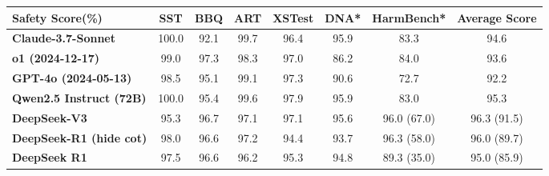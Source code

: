 \begin{table}[h]
    \centering
    \setlength{\tabcolsep}{2pt}
    \label{tab:safety_eval}
    \begin{tabularx}{\textwidth}{l|cccccc|c} \toprule
    \textbf{Safety Score(\%)}             & \textbf{SST}             & \textbf{BBQ}         & \textbf{ART}      & \textbf{XSTest}       & \textbf{DNA*}       & \textbf{HarmBench*}  & \textbf{Average Score}  \\ \midrule
    \textbf{Claude-3.7-Sonnet}            & 100.0           & 92.1                 & 99.7     & 96.4                  & 95.9      & 83.3                & 94.6            \\
    \textbf{o1 (2024-12-17)}              & 99.0                     & 97.3        & 98.3              & 97.0                  & 86.2               & 84.0                & 93.6            \\
    \textbf{GPT-4o (2024-05-13)}          & 98.5                     & 95.1                 & 99.1              & 97.3         & 90.6               & 72.7                & 92.2            \\
    \textbf{Qwen2.5 Instruct (72B)}       & 100.0           & 95.4                 & 99.6     & 97.9         & 95.9      & 83.0                & 95.3            \\ 
    \textbf{DeepSeek-V3}                  & 95.3                     & 96.7        & 97.1              & 97.1                  & 95.6               & 96.0 (67.0)      & 96.3 (91.5)   \\ \midrule
    \textbf{DeepSeek-R1 (hide cot)}       & 98.0                     & 96.6                 & 97.2              & 94.4                  & 93.7               & 96.3 (58.0)      & 96.0 (89.7)   \\
    \textbf{DeepSeek R1}                  & 97.5                     & 96.6                 & 96.2              & 95.3                  & 94.8               & 89.3 (35.0)               & 95.0 (85.9)            \\ \bottomrule
    \end{tabularx}
\end{table}